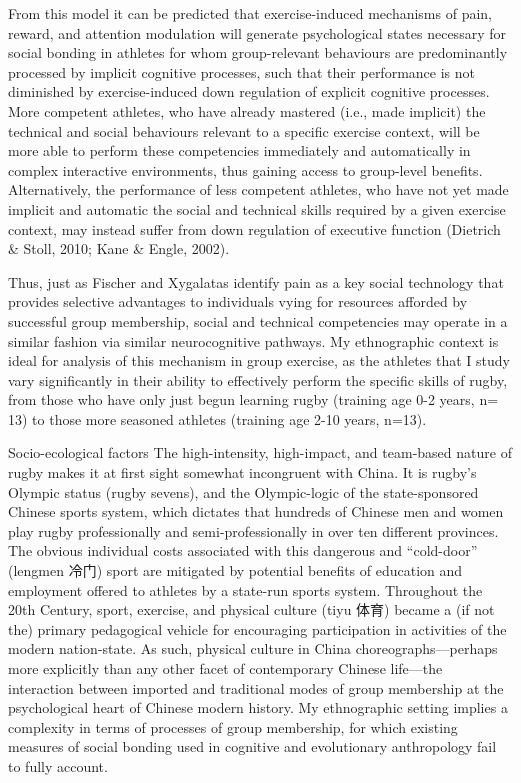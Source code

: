 \documentclass[12pt]{report}
\begin{document}
From this model it can be predicted that exercise-induced mechanisms of pain, reward, and attention modulation will generate psychological states necessary for social bonding in athletes for whom group-relevant behaviours are predominantly processed by implicit cognitive processes, such that their performance is not diminished by exercise-induced down regulation of explicit cognitive processes.  More competent athletes, who have already mastered (i.e., made implicit) the technical and social behaviours relevant to a specific exercise context, will be more able to perform these competencies immediately and automatically in complex interactive environments, thus gaining access to group-level benefits.  Alternatively, the performance of less competent athletes, who have not yet made implicit and automatic the social and technical skills required by a given exercise context, may instead suffer from down regulation of executive function (Dietrich & Stoll, 2010; Kane & Engle, 2002).

Thus, just as Fischer and Xygalatas identify pain as a key social technology that provides selective advantages to individuals vying for resources afforded by successful group membership, social and technical competencies may operate in a similar fashion via similar neurocognitive pathways. My ethnographic context is ideal for analysis of this mechanism in group exercise, as the athletes that I study vary significantly in their ability to effectively perform the specific skills of rugby, from those who have only just begun learning rugby (training age 0-2 years, n= 13) to those more seasoned athletes (training age 2-10 years, n=13).

Socio-ecological factors
The high-intensity, high-impact, and team-based nature of rugby makes it at first sight somewhat incongruent with China. It is rugby’s Olympic status (rugby sevens), and the Olympic-logic of the state-sponsored Chinese sports system, which dictates that hundreds of Chinese men and women play rugby professionally and semi-professionally in over ten different provinces.  The obvious individual costs associated with this dangerous and “cold-door” (lengmen 冷门) sport are mitigated by potential benefits of education and employment offered to athletes by a state-run sports system.  Throughout the 20th Century, sport, exercise, and physical culture (tiyu 体育) became a (if not the) primary pedagogical vehicle for encouraging participation in activities of the modern nation-state.  As such, physical culture in China choreographs—perhaps more explicitly than any other facet of contemporary Chinese life—the interaction between imported and traditional modes of group membership at the psychological heart of Chinese modern history.  My ethnographic setting implies a complexity in terms of processes of group membership, for which existing measures of social bonding used in cognitive and evolutionary anthropology fail to fully account.
\end{document}
